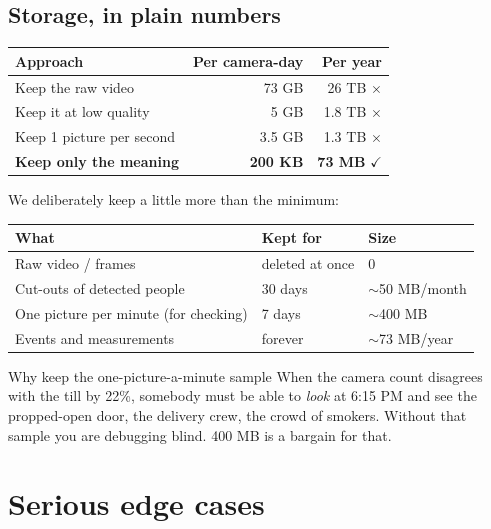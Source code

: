 \documentclass[11pt,a4paper]{article}
\newcommand{\tick}{\textcolor{ok}{$\checkmark$}}
\newcommand{\cross}{\textcolor{bad}{$\times$}}
\begin{document}
\subsection{Storage, in plain numbers}

\begin{center}
\begin{tabular}{@{}lrr@{}}
\toprule
\textbf{Approach} & \textbf{Per camera-day} & \textbf{Per year} \\
\midrule
Keep the raw video          & 73 GB   & 26 TB \phantom{aa}\cross \\
Keep it at low quality      & 5 GB    & 1.8 TB \phantom{a}\cross \\
Keep 1 picture per second   & 3.5 GB  & 1.3 TB \phantom{a}\cross \\
\textbf{Keep only the meaning} & \textbf{200 KB} & \textbf{73 MB} \phantom{aa}\tick \\
\bottomrule
\end{tabular}
\end{center}

We deliberately keep a little more than the minimum:

\begin{center}
\begin{tabular}{@{}lll@{}}
\toprule
\textbf{What} & \textbf{Kept for} & \textbf{Size} \\
\midrule
Raw video / frames                  & deleted at once & 0 \\
Cut-outs of detected people         & 30 days & $\sim$50 MB/month \\
One picture per minute (for checking) & 7 days & $\sim$400 MB \\
Events and measurements             & forever & $\sim$73 MB/year \\
\bottomrule
\end{tabular}
\end{center}

\begin{note}{Why keep the one-picture-a-minute sample}
When the camera count disagrees with the till by 22\%, somebody must be
able to \emph{look} at 6:15 PM and see the propped-open door, the delivery
crew, the crowd of smokers. Without that sample you are debugging blind.
400 MB is a bargain for that.
\end{note}

\section{Serious edge cases}
\end{document}
